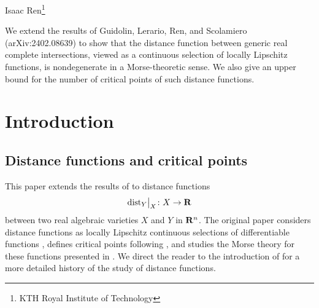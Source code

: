 

\newrefsection

\setcounter{footnotevalue}{\value{footnote}}
\setcounter{footnote}{0}
\renewcommand*{\thefootnote}{\roman{footnote}}
{\sffamily Isaac Ren\footnote{KTH Royal Institute of Technology}}
\setcounter{footnote}{\value{footnotevalue}}
\renewcommand*{\thefootnote}{\arabic{footnote}}

\begin{paperabstract}
  We extend the results of Guidolin, Lerario, Ren, and Scolamiero (arXiv:2402.08639) to show that the distance function between generic real complete intersections, viewed as a continuous selection of locally Lipschitz functions, is nondegenerate in a Morse-theoretic sense. We also give an upper bound for the number of critical points of such distance functions.
\end{paperabstract}

\section{Introduction}

\subsection{Distance functions and critical points}

This paper extends the results of \cite{GLRS2025} to distance functions
\[
  \mathord{\operatorname{dist}}_Y\big|_X \colon X \to \mathbf{R}
\]
between two real algebraic varieties $X$ and $Y$ in $\mathbf{R}^n$. The original paper considers distance functions as locally Lipschitz continuous selections of differentiable functions \cite{JongenPallaschke1988}, defines critical points following \cite{Clarke}, and studies the Morse theory for these functions presented in \cite{APS1997}. We direct the reader to the introduction of \cite{GLRS2025} for a more detailed history of the study of distance functions.

